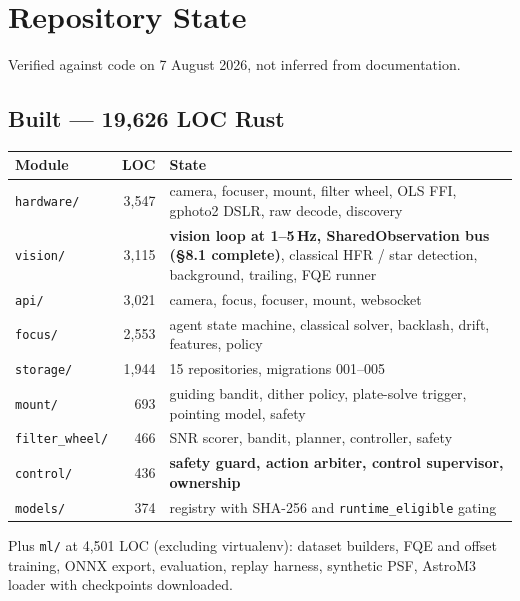\documentclass[11pt]{article}
\begin{document}
\section{Repository State}

Verified against code on 7 August 2026, not inferred from documentation.

\subsection{Built --- 19,626 LOC Rust}

\begin{center}
\small
\begin{tabular}{@{}lrp{8.4cm}@{}}
\toprule
\textbf{Module} & \textbf{LOC} & \textbf{State} \\
\midrule
\texttt{hardware/} & 3{,}547 & camera, focuser, mount, filter wheel, OLS FFI, gphoto2 DSLR, raw decode, discovery \\
\texttt{vision/} & 3{,}115 & \textbf{vision loop at 1--5\,Hz, SharedObservation bus (§8.1 complete)}, classical HFR / star detection, background, trailing, FQE runner \\
\texttt{api/} & 3{,}021 & camera, focus, focuser, mount, websocket \\
\texttt{focus/} & 2{,}553 & agent state machine, classical solver, backlash, drift, features, policy \\
\texttt{storage/} & 1{,}944 & 15 repositories, migrations 001--005 \\
\texttt{mount/} & 693 & guiding bandit, dither policy, plate-solve trigger, pointing model, safety \\
\texttt{filter\_wheel/} & 466 & SNR scorer, bandit, planner, controller, safety \\
\texttt{control/} & 436 & \textbf{safety guard, action arbiter, control supervisor, ownership} \\
\texttt{models/} & 374 & registry with SHA-256 and \texttt{runtime\_eligible} gating \\
\bottomrule
\end{tabular}
\end{center}

\vspace{0.5em}
Plus \texttt{ml/} at 4,501 LOC (excluding virtualenv): dataset builders, FQE and
offset training, ONNX export, evaluation, replay harness, synthetic PSF,
AstroM3 loader with checkpoints downloaded.
\end{document}
